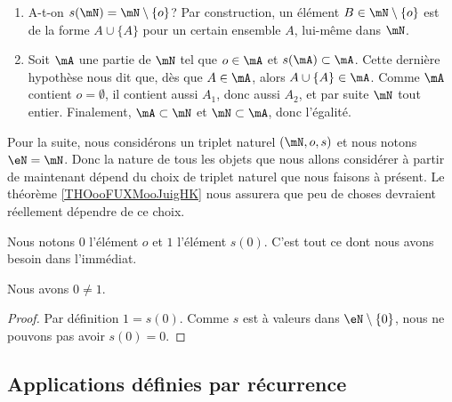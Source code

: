 \begin{normaltext}
\begin{subproof}
\begin{enumerate}
			\item A-t-on \( s( \mN ) = \mN \setminus \{ o \} \)? Par construction, un élément \( B \in  \mN \setminus \{ o \} \) est de la forme \( A \cup \{ A \} \) pour un certain ensemble \( A \), lui-même dans \( \mN \).
			\item Soit \( \mA \) une partie de \( \mN \) tel que \( o \in \mA \) et \( s(\mA) \subset \mA \). Cette dernière hypothèse nous dit que, dès que \( A \in \mA \), alors \( A \cup \{ A \} \in \mA \). Comme \( \mA \) contient \( o = \emptyset \), il contient aussi \( A_1 \), donc aussi \( A_2 \), et par suite \( \mN \) tout entier. Finalement, \( \mA \subset \mN \) et \( \mN \subset \mA \), donc l'égalité.
		\end{enumerate}
	\end{subproof}
\end{normaltext}

\begin{normaltext}[Définition de \( \eN\)]    \label{NORooDefinitionNChoixTriplet}
	Pour la suite, nous considérons un triplet naturel \( (\mN,o,s)\) et nous notons \( \eN=\mN\). Donc la nature de tous les objets que nous allons considérer à partir de maintenant dépend du choix de triplet naturel que nous faisons à présent. Le théorème \ref{THOooFUXMooJuigHK} nous assurera que peu de choses devraient réellement dépendre de ce choix.

	Nous notons \( 0\) l'élément \( o\) et \( 1\) l'élément \( s(0)\). C'est tout ce dont nous avons besoin dans l'immédiat.
\end{normaltext}

\begin{lemma}       \label{LEMooCOMSooEWrumL}
	Nous avons \( 0\neq 1\).
\end{lemma}

\begin{proof}
	Par définition \( 1=s(0)\). Comme \( s\) est à valeurs dans \( \eN\setminus\{ 0 \}\), nous ne pouvons pas avoir \( s(0)=0\).
\end{proof}

\subsection{Applications définies par récurrence}
\label{SUBooApplicationRecurrence}

